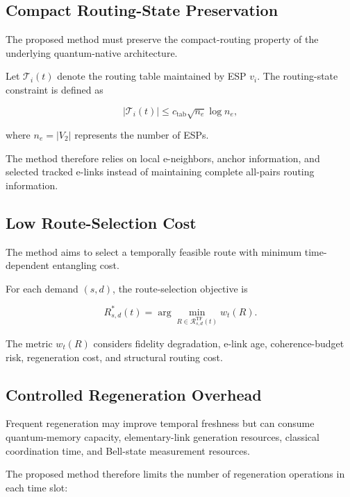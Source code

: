 \subsection{Compact Routing-State Preservation}

The proposed method must preserve the compact-routing property of the underlying quantum-native architecture.

Let $\mathcal{T}_i(t)$ denote the routing table maintained by ESP $v_i$. The routing-state constraint is defined as

\begin{equation}
    |\mathcal{T}_i(t)|
    \leq
    c_{\mathrm{tab}}
    \sqrt{n_e}\log n_e,
\end{equation}

where $n_e=|V_2|$ represents the number of ESPs.

The method therefore relies on local e-neighbors, anchor information, and selected tracked e-links instead of maintaining complete all-pairs routing information.

\subsection{Low Route-Selection Cost}

The method aims to select a temporally feasible route with minimum time-dependent entangling cost.

For each demand $(s,d)$, the route-selection objective is

\begin{equation}
    R_{s,d}^{*}(t)
    =
    \arg\min_{
    R
    \in
    \mathcal{R}_{s,d}^{\mathrm{TF}}(t)
    }
    w_t(R).
\end{equation}

The metric $w_t(R)$ considers fidelity degradation, e-link age, coherence-budget risk, regeneration cost, and structural routing cost.

\subsection{Controlled Regeneration Overhead}

Frequent regeneration may improve temporal freshness but can consume quantum-memory capacity, elementary-link generation resources, classical coordination time, and Bell-state measurement resources.

The proposed method therefore limits the number of regeneration operations in each time slot:

